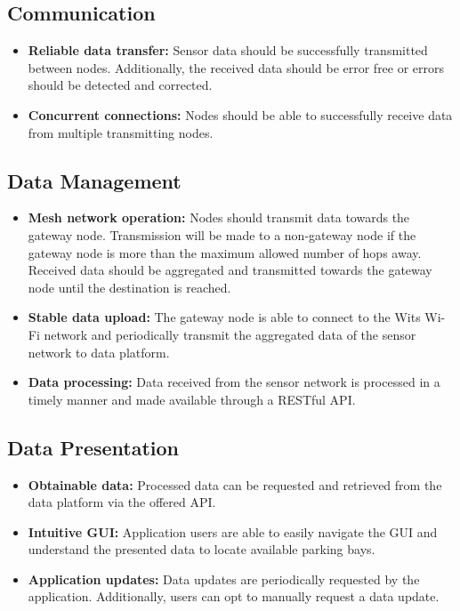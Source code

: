 \documentclass[10pt,twocolumn]{witseiepaper}
\begin{document}
	\subsection{Communication}
		\begin{itemize}
			\item \textbf{Reliable data transfer:} Sensor data should be successfully transmitted between nodes. Additionally, the received data should be error free or errors should be detected and corrected.
			\vspace{1em}
			\item  \textbf{Concurrent connections:} Nodes should be able to successfully receive data from multiple transmitting nodes.
		\end{itemize}
	
	\subsection{Data Management}
		\begin{itemize}
			\item \textbf{Mesh network operation:} Nodes should transmit data towards the gateway node. Transmission will be made to a non-gateway node if the gateway node is more than the maximum allowed number of hops away. Received data should be aggregated and transmitted towards the gateway node until the destination is reached.
			\vspace{1em}
			\item  \textbf{Stable data upload:} The gateway node is able to connect to the Wits Wi-Fi network and periodically transmit the aggregated data of the sensor network to data platform.
			\vspace{1em}
			\item \textbf{Data processing:} Data received from the sensor network is processed in a timely manner and made available through a RESTful API.
		\end{itemize}
	
	\subsection{Data Presentation}
		\begin{itemize}
			\item \textbf{Obtainable data:} Processed data can be requested and retrieved from the data platform via the offered API.
			\vspace{1em}
			\item \textbf{Intuitive GUI:} Application users are able to easily navigate the GUI and understand the presented data to locate available parking bays.
			\vspace{1em}
			\item \textbf{Application updates:} Data updates are periodically requested by the application. Additionally, users can opt to manually request a data update.
		\end{itemize}
\end{document}
